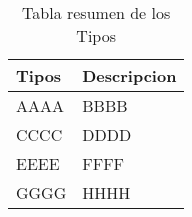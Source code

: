 \begin{table}[!ht]
\begin{center}
\begin{tabular}{|p{25mm}|p{80mm}|} \hline 
\textbf{Tipos } & \textbf{Descripcion} \\ \hline
AAAA &
BBBB
\\
\hline

CCCC &
DDDD
\\
\hline

EEEE &
FFFF
\\
\hline

GGGG &
HHHH
\\
\hline

\end{tabular}
\end{center}
\caption{Tabla resumen de los Tipos}
\label{table:resOthers}
\end{table}

